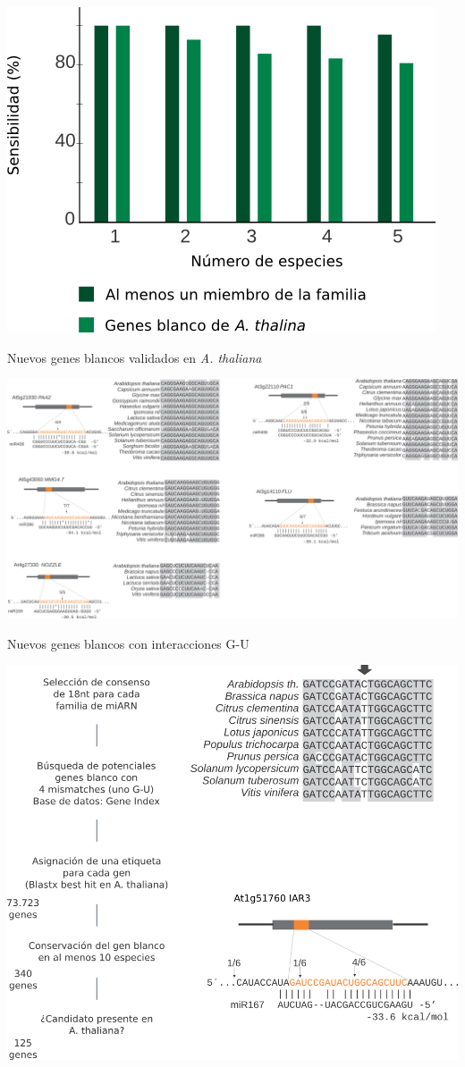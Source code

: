 \documentclass{beamer}
\begin{document}
\begin{frame}{}
	\begin{center}
		\includegraphics[width=.5\textwidth]{img/extras/NAR_fig3B.png}
	\end{center}
\end{frame}

\begin{frame}{Nuevos genes blancos validados en \textit{A. thaliana}}
	\begin{center}
		\includegraphics[width=1\textwidth]{img/Figure4_retocada.png}
	\end{center}
\end{frame}

\begin{frame}{Nuevos genes blancos con interacciones G-U}
	\begin{center}
		\includegraphics[width=.6\textwidth]{img/Figure5_retocada.png}
	\end{center}
\end{frame}
\end{document}
